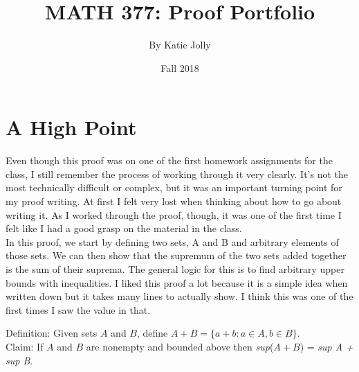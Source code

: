 \documentclass{article}
\title{MATH 377: Proof Portfolio}
\author{By Katie Jolly}
\date{Fall 2018}
\begin{document}
\maketitle

\section{A High Point}

Even though this proof was on one of the first homework assignments for the class, I still remember the process of working through it very clearly. It's not the most technically difficult or complex, but it was an important turning point for my proof writing. At first I felt very lost when thinking about how to go about writing it. As I worked through the proof, though, it was one of the first time I felt like I had a good grasp on the material in the class. \\

In this proof, we start by defining two sets, A and B and arbitrary elements of those sets. We can then show that the supremum of the two sets added together is the sum of their suprema. The general logic for this is to find arbitrary upper bounds with inequalities. I liked this proof a lot because it is a simple idea when written down but it takes many lines to actually show. I think this was one of the first times I saw the value in that.\\ 

\begin{definition}
Definition: Given sets $A$ and $B$, define $A + B= \{a + b: a \in A, b \in B\}$.\\

\noindent Claim: If $A$ and $B$ are nonempty and bounded above then \textit{sup}($A + B$) = \textit{sup A + sup B}.
\end{definition}
\end{document}
